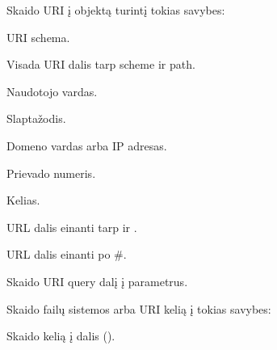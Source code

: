 \documentclass[letterpaper,10pt,lithuanian]{sphinxmanual}
\begin{document}
\begin{fulllineitems}
\begin{fulllineitems}
\end{fulllineitems}


\begin{fulllineitems}
\label{\detokenize{formules:func.url}}
\pysigstartsignatures
{}
\pysigstopsignatures
\sphinxAtStartPar
Skaido URI į objektą turintį tokias savybes:
\begin{description}
\sphinxAtStartPar
URI schema.

\sphinxAtStartPar
Visada URI dalis tarp scheme ir path.

\sphinxAtStartPar
Naudotojo vardas.

\sphinxAtStartPar
Slaptažodis.

\sphinxAtStartPar
Domeno vardas arba IP adresas.

\sphinxAtStartPar
Prievado numeris.

\sphinxAtStartPar
Kelias.

\sphinxAtStartPar
URL dalis einanti tarp  ir \sphinxcode{\sphinxupquote{\#}}.

\sphinxAtStartPar
URL dalis einanti po \#.

\end{description}

\end{fulllineitems}


\begin{fulllineitems}
\label{\detokenize{formules:func.query}}
\pysigstartsignatures
{}
\pysigstopsignatures
\sphinxAtStartPar
Skaido URI query dalį į parametrus.

\end{fulllineitems}


\begin{fulllineitems}
\label{\detokenize{formules:func.path}}
\pysigstartsignatures
{}
\pysigstopsignatures
\sphinxAtStartPar
Skaido failų sistemos arba URI kelią į tokias savybes:
\begin{description}
\sphinxAtStartPar
Skaido kelią į dalis ().


\end{description}
\end{fulllineitems}
\end{fulllineitems}
\end{document}
